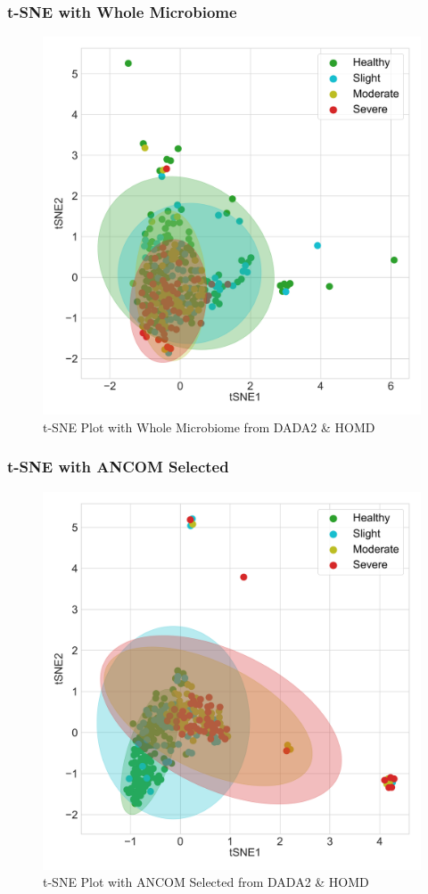 \documentclass{beamer}
\begin{document}
    \begin{frame}
        \frametitle{t-SNE with Whole Microbiome}

        \begin{figure}
            \includegraphics[width=0.5 \linewidth]{figures/tSNE/Whole/whole.DADA2.homd.pdf}
            \caption{t-SNE Plot with Whole Microbiome from DADA2 \& HOMD}
        \end{figure}
    \end{frame}

    \begin{frame}
        \frametitle{t-SNE with ANCOM Selected}

        \begin{figure}
            \includegraphics[width=0.5 \linewidth]{figures/tSNE/ANCOM/ANCOM.DADA2.homd.pdf}
            \caption{t-SNE Plot with ANCOM Selected from DADA2 \& HOMD}
        \end{figure}
    \end{frame}
\end{document}
